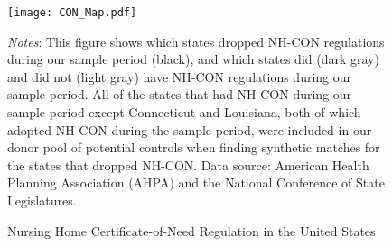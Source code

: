 \documentclass[../Main.tex]{subfiles}
\begin{document}
\newpage
\begin{figure}[t]
	\begin{center}
	\caption{\label{fig:nh_con_map} \centering Nursing Home Certificate-of-Need Regulation in the United States}
    \texttt{[image: CON\_Map.pdf]}
    \end{center}
    \footnotesize
		\textit{Notes}: This figure shows which states dropped NH-CON regulations during our sample period (black), and which states did (dark gray) and did not (light gray) have NH-CON regulations during our sample period. All of the states that had NH-CON during our sample period except Connecticut and Louisiana, both of which adopted NH-CON during the sample period, were included in our donor pool of potential controls when finding synthetic matches for the states that dropped NH-CON. Data source: American Health Planning Association (AHPA) and the National Conference of State Legislatures.
\end{figure}
\clearpage
\end{document}
